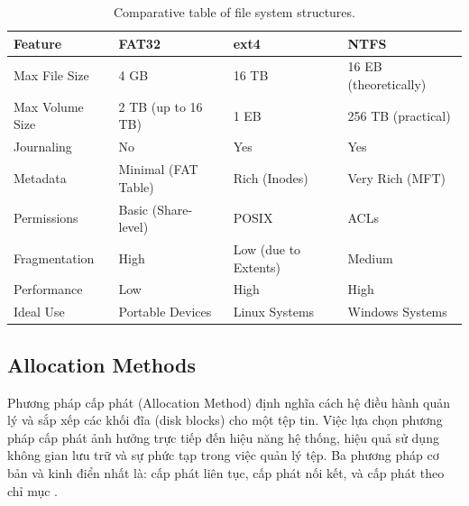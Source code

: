 \documentclass[12pt]{article}
\begin{document}
 \begin{table}[H]
     \centering
     \caption{Comparative table of file system structures.}
     \label{tab:fs_comparison}
     \begin{tabular}{@{}llll@{}}
         \toprule
         \textbf{Feature} & \textbf{FAT32} & \textbf{ext4} & \textbf{NTFS} \\ 
         \midrule
         Max File Size     & 4 GB                  & 16 TB                 & 16 EB (theoretically) \\
         Max Volume Size   & 2 TB (up to 16 TB)    & 1 EB                  & 256 TB (practical)    \\
         Journaling        & No                  & Yes                 & Yes                 \\
         Metadata          & Minimal (FAT Table)   & Rich (Inodes)         & Very Rich (MFT)       \\
         Permissions       & Basic (Share-level)   & POSIX                 & ACLs                  \\
         Fragmentation     & High                  & Low (due to Extents)  & Medium                \\
         Performance       & Low                   & High                  & High                  \\
         Ideal Use         & Portable Devices      & Linux Systems         & Windows Systems       \\ 
         \bottomrule
     \end{tabular}
 \end{table}




\subsection{Allocation Methods}
Phương pháp cấp phát (Allocation Method) định nghĩa cách hệ điều hành quản lý và sắp xếp các khối đĩa (disk blocks) cho một tệp tin. Việc lựa chọn phương pháp cấp phát ảnh hưởng trực tiếp đến hiệu năng hệ thống, hiệu quả sử dụng không gian lưu trữ và sự phức tạp trong việc quản lý tệp. Ba phương pháp cơ bản và kinh điển nhất là: cấp phát liên tục, cấp phát nối kết, và cấp phát theo chỉ mục \parencite{Silberschatz2018}.
\end{document}
